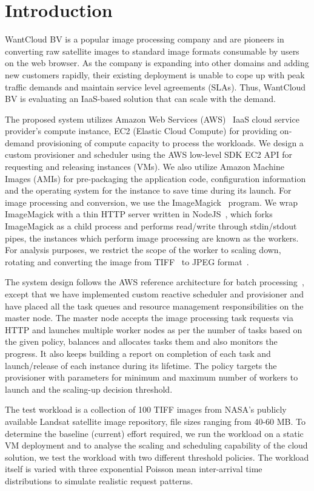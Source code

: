 \documentclass[a4paper]{IEEEtran}
\begin{document}
\section{Introduction}

WantCloud BV is a popular image processing company and are pioneers in converting raw satellite images to standard image formats consumable by users on the web browser. As the company is expanding into other domains and 
adding new customers rapidly, their existing deployment is unable to cope up with peak traffic demands and
 maintain service level agreements (SLAs). Thus, WantCloud BV is evaluating an IaaS-based solution that
 can scale with the demand.

The proposed system utilizes Amazon Web Services (AWS)~\cite{aws} IaaS cloud service provider's compute instance, EC2 (Elastic Cloud Compute) for providing on-demand provisioning of compute capacity to process the workloads.
We design a custom provisioner and scheduler using the AWS low-level SDK EC2 API for requesting and releasing instances (VMs).
We also utilize Amazon Machine Images (AMIs) for pre-packaging the application code,
configuration information and the operating system for the instance to save time during its launch. For image processing and conversion, we use the ImageMagick~\cite{imagemagick} program. We wrap ImageMagick with a thin HTTP server written in NodeJS~\cite{nodejs}, which forks ImageMagick as a child process and performs read/write through stdin/stdout pipes, the instances which perform image processing are known as
the workers. For analysis purposes, we restrict the scope of the worker to scaling down, rotating and converting the
image from TIFF~\cite{rfc3302} to JPEG format~\cite{jpeg}.

The system design follows the AWS reference architecture for batch processing~\cite{aws_batch}, except that we have
implemented custom reactive scheduler and provisioner and have placed all the task queues and resource management responsibilities on the master node. The master node accepts the image processing task requests via HTTP and launches multiple worker nodes as per the number of tasks based on the given policy, balances and allocates tasks them and also monitors the progress. It also keeps building a report on completion of each task and launch/release of each instance during its lifetime. The policy targets the provisioner with parameters for minimum and maximum
number of workers to launch and the scaling-up decision threshold.

The test workload is a collection of 100 TIFF images from NASA's publicly available Landsat satellite image repository, file sizes ranging from 40-60 MB. To determine the baseline (current) effort required, we run the workload on a static VM deployment and to analyse the scaling and scheduling capability of the cloud solution, we test the workload with two different threshold policies. The workload itself is varied with three exponential Poisson mean inter-arrival time distributions to simulate realistic request patterns.
\end{document}
